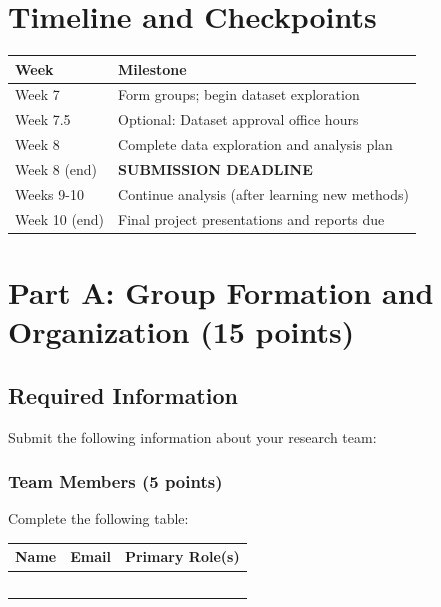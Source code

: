 \documentclass[11pt]{article}
\begin{document}
\section*{Timeline and Checkpoints}

\begin{table}[h]
\centering
\begin{tabular}{lp{10cm}}
\toprule
\textbf{Week} & \textbf{Milestone} \\
\midrule
Week 7 & Form groups; begin dataset exploration \\
Week 7.5 & Optional: Dataset approval office hours \\
Week 8 & Complete data exploration and analysis plan \\
Week 8 (end) & \textbf{SUBMISSION DEADLINE} \\
\midrule
Weeks 9-10 & Continue analysis (after learning new methods) \\
Week 10 (end) & Final project presentations and reports due \\
\bottomrule
\end{tabular}
\end{table}

\newpage

\section{Part A: Group Formation and Organization (15 points)}

\subsection{Required Information}

Submit the following information about your research team:

\subsubsection{Team Members (5 points)}

Complete the following table:

\begin{center}
\begin{tabular}{|l|l|l|}
\hline
\textbf{Name} & \textbf{Email} & \textbf{Primary Role(s)} \\
\hline
& & \\[2ex]
\hline
& & \\[2ex]
\hline
& & \\[2ex]
\hline
& & \\[2ex]
\hline
& & \\[2ex]
\hline
\end{tabular}
\end{center}
\end{document}
